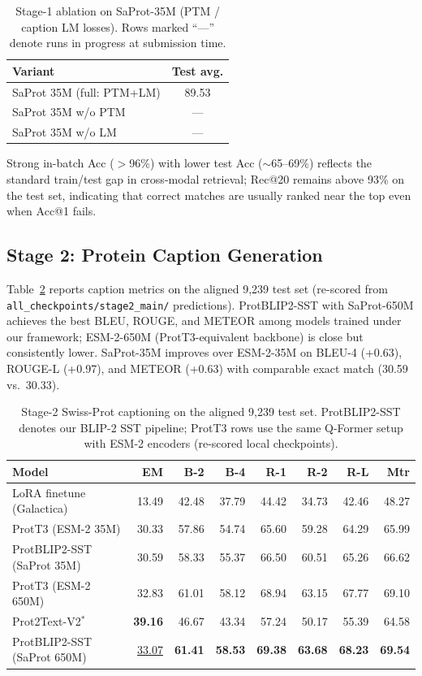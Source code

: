 \documentclass[conference]{IEEEtran}
\newcommand{\best}[1]{\textbf{#1}}
\newcommand{\secondbest}[1]{\underline{#1}}
\begin{document}
\begin{table}[t]
  \caption{Stage-1 ablation on SaProt-35M (PTM / caption LM losses). Rows marked ``---'' denote runs in progress at submission time.}
  \label{tab:stage1-ablation}
  \centering
  \small
  \begin{tabular}{l c}
    \toprule
    Variant & Test avg. \\
    \midrule
    SaProt 35M (full: PTM+LM) & 89.53 \\
    SaProt 35M w/o PTM & --- \\
    SaProt 35M w/o LM  & --- \\
    \bottomrule
  \end{tabular}
\end{table}

Strong in-batch Acc ($>$96\%) with lower test Acc ($\sim$65--69\%) reflects the standard train/test gap in cross-modal retrieval; Rec@20 remains above 93\% on the test set, indicating that correct matches are usually ranked near the top even when Acc@1 fails.

\subsection{Stage 2: Protein Caption Generation}

Table~\ref{tab:stage2-main} reports caption metrics on the aligned 9{,}239 test set (re-scored from \texttt{all\_checkpoints/stage2\_main/} predictions).
ProtBLIP2-SST with SaProt-650M achieves the best BLEU, ROUGE, and METEOR among models trained under our framework; ESM-2-650M (ProtT3-equivalent backbone) is close but consistently lower.
SaProt-35M improves over ESM-2-35M on BLEU-4 (+0.63), ROUGE-L (+0.97), and METEOR (+0.63) with comparable exact match (30.59 vs.\ 30.33).

\begin{table}[t]
  \caption{Stage-2 Swiss-Prot captioning on the aligned 9{,}239 test set. ProtBLIP2-SST denotes our BLIP-2 SST pipeline; ProtT3 rows use the same Q-Former setup with ESM-2 encoders (re-scored local checkpoints).}
  \label{tab:stage2-main}
  \centering
  \small
  \setlength{\tabcolsep}{3pt}
  \begin{tabular}{l r r r r r r r}
    \toprule
    Model & EM & B-2 & B-4 & R-1 & R-2 & R-L & Mtr \\
    \midrule
    LoRA finetune (Galactica) & 13.49 & 42.48 & 37.79 & 44.42 & 34.73 & 42.46 & 48.27 \\
    ProtT3 (ESM-2 35M) & 30.33 & 57.86 & 54.74 & 65.60 & 59.28 & 64.29 & 65.99 \\
    ProtBLIP2-SST (SaProt 35M) & 30.59 & 58.33 & 55.37 & 66.50 & 60.51 & 65.26 & 66.62 \\
    ProtT3 (ESM-2 650M) & 32.83 & 61.01 & 58.12 & 68.94 & 63.15 & 67.77 & 69.10 \\
    Prot2Text-V2$^{*}$ & \best{39.16} & 46.67 & 43.34 & 57.24 & 50.17 & 55.39 & 64.58 \\
    ProtBLIP2-SST (SaProt 650M) & \secondbest{33.07} & \best{61.41} & \best{58.53} & \best{69.38} & \best{63.68} & \best{68.23} & \best{69.54} \\
    \bottomrule
  \end{tabular}
\end{table}
\end{document}
